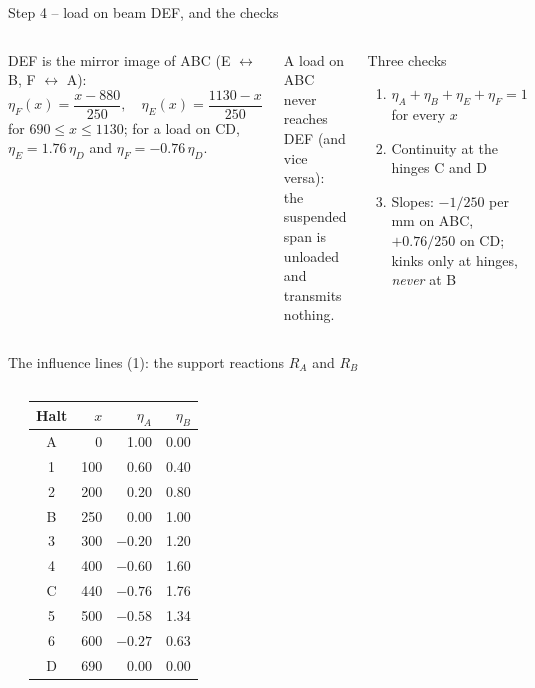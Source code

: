 \documentclass[aspectratio=169,11pt]{beamer}
\renewcommand{\ILscale}{0.0100}
\newcommand{\il}[1]{\eta_{#1}}
\begin{document}
\begin{frame}{Step 4 -- load on beam DEF, and the checks}
\begin{columns}[T]
DEF is the mirror image of ABC (E $\leftrightarrow$ B, F $\leftrightarrow$ A):
\[
  \il{F}(x) = \frac{x - 880}{250}, \quad \il{E}(x) = \frac{1130 - x}{250}
\]
for $690 \le x \le 1130$; for a load on CD, $\il{E} = 1.76\,\il{D}$ and $\il{F} = -0.76\,\il{D}$.
\medskip

A load on ABC never reaches DEF (and vice versa): the suspended span is unloaded and transmits nothing.
\begin{block}{Three checks}
\begin{enumerate}
  \item $\il{A} + \il{B} + \il{E} + \il{F} = 1$ for every $x$
  \item Continuity at the hinges C and D
  \item Slopes: $-1/250$ per mm on ABC, $+0.76/250$ on CD; kinks only at hinges, \emph{never} at B
\end{enumerate}
\end{block}
\end{columns}
\end{frame}

\begin{frame}{The influence lines (1): the support reactions $R_A$ and $R_B$}
\begin{columns}[T]
\renewcommand{\ILyscale}{0.72}\renewcommand{\ILscale}{0.0055}
\\[4pt]
\small
\begin{tabular}{@{}c r r r@{}}
\toprule
Halt & $x$ & $\il{A}$ & $\il{B}$\\
\midrule
A & 0 & 1.00 & 0.00\\
1 & 100 & 0.60 & 0.40\\
2 & 200 & 0.20 & 0.80\\
B & 250 & 0.00 & 1.00\\
3 & 300 & $-0.20$ & 1.20\\
4 & 400 & $-0.60$ & 1.60\\
C & 440 & $-0.76$ & 1.76\\
5 & 500 & $-0.58$ & 1.34\\
6 & 600 & $-0.27$ & 0.63\\
D & 690 & 0.00 & 0.00\\
\bottomrule
\end{tabular}
\end{columns}
\end{frame}
\end{document}

